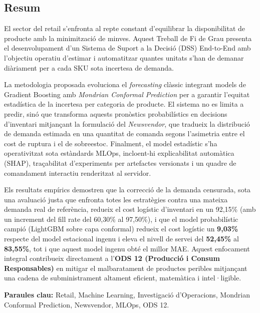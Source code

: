 \begin{otherlanguage}{catalan}
\chapter*{Resum}

El sector del retail s'enfronta al repte constant d'equilibrar la disponibilitat de producte amb la minimització de minves. Aquest Treball de Fi de Grau presenta el desenvolupament d'un Sistema de Suport a la Decisió (DSS) End-to-End amb l'objectiu operatiu d'estimar i automatitzar quantes unitats s'han de demanar diàriament per a cada SKU sota incertesa de demanda.

La metodologia proposada evoluciona el \textit{forecasting} clàssic integrant models de Gradient Boosting amb \textit{Mondrian Conformal Prediction} per a garantir l'equitat estadística de la incertesa per categoria de producte. El sistema no es limita a predir, sinó que transforma aquests pronòstics probabilístics en decisions d'inventari mitjançant la formulació del \textit{Newsvendor}, que tradueix la distribució de demanda estimada en una quantitat de comanda segons l'asimetria entre el cost de ruptura i el de sobreestoc. Finalment, el model estadístic s'ha operativitzat sota estàndards MLOps, incloent-hi explicabilitat automàtica (SHAP), traçabilitat d'experiments per artefactes versionats i un quadre de comandament interactiu renderitzat al servidor.

Els resultats empírics demostren que la correcció de la demanda censurada, sota una avaluació justa que enfronta totes les estratègies contra una mateixa demanda real de referència, redueix el cost logístic d'inventari en un 92{,}15\% (amb un increment del fill rate del 60{,}30\% al 97{,}50\%), i que el model probabilístic campió (LightGBM sobre capa conformal) redueix el cost logístic un \textbf{9{,}03\%} respecte del model estacional ingenu i eleva el nivell de servei del \textbf{52{,}45\%} al \textbf{83{,}55\%}, tot i que aquest model ingenu obté el millor MAE. Aquest enfocament integral contribueix directament a l'\textbf{ODS 12 (Producció i Consum Responsables)} en mitigar el malbaratament de productes peribles mitjançant una cadena de subministrament altament eficient, matemàtica i intel·ligible.

\textbf{Paraules clau:} Retail, Machine Learning, Investigació d'Operacions, Mondrian Conformal Prediction, Newsvendor, MLOps, ODS 12.
\end{otherlanguage}

